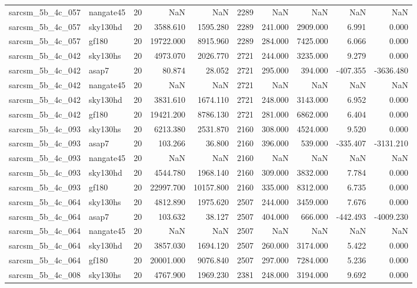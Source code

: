 \documentclass{article}
\begin{document}
\begin{longtable}{llrrrrrrrr}
sarcsm\_5b\_4c\_057 & nangate45 & 20 & NaN & NaN & 2289 & NaN & NaN & NaN & NaN \\
sarcsm\_5b\_4c\_057 & sky130hd & 20 & 3588.610 & 1595.280 & 2289 & 241.000 & 2909.000 & 6.991 & 0.000 \\
sarcsm\_5b\_4c\_057 & gf180 & 20 & 19722.000 & 8915.960 & 2289 & 284.000 & 7425.000 & 6.066 & 0.000 \\
sarcsm\_5b\_4c\_042 & sky130hs & 20 & 4973.070 & 2026.770 & 2721 & 244.000 & 3235.000 & 9.279 & 0.000 \\
sarcsm\_5b\_4c\_042 & asap7 & 20 & 80.874 & 28.052 & 2721 & 295.000 & 394.000 & -407.355 & -3636.480 \\
sarcsm\_5b\_4c\_042 & nangate45 & 20 & NaN & NaN & 2721 & NaN & NaN & NaN & NaN \\
sarcsm\_5b\_4c\_042 & sky130hd & 20 & 3831.610 & 1674.110 & 2721 & 248.000 & 3143.000 & 6.952 & 0.000 \\
sarcsm\_5b\_4c\_042 & gf180 & 20 & 19421.200 & 8786.130 & 2721 & 281.000 & 6862.000 & 6.404 & 0.000 \\
sarcsm\_5b\_4c\_093 & sky130hs & 20 & 6213.380 & 2531.870 & 2160 & 308.000 & 4524.000 & 9.520 & 0.000 \\
sarcsm\_5b\_4c\_093 & asap7 & 20 & 103.266 & 36.800 & 2160 & 396.000 & 539.000 & -335.407 & -3131.210 \\
sarcsm\_5b\_4c\_093 & nangate45 & 20 & NaN & NaN & 2160 & NaN & NaN & NaN & NaN \\
sarcsm\_5b\_4c\_093 & sky130hd & 20 & 4544.780 & 1968.140 & 2160 & 309.000 & 3832.000 & 7.784 & 0.000 \\
sarcsm\_5b\_4c\_093 & gf180 & 20 & 22997.700 & 10157.800 & 2160 & 335.000 & 8312.000 & 6.735 & 0.000 \\
sarcsm\_5b\_4c\_064 & sky130hs & 20 & 4812.890 & 1975.620 & 2507 & 244.000 & 3459.000 & 7.676 & 0.000 \\
sarcsm\_5b\_4c\_064 & asap7 & 20 & 103.632 & 38.127 & 2507 & 404.000 & 666.000 & -442.493 & -4009.230 \\
sarcsm\_5b\_4c\_064 & nangate45 & 20 & NaN & NaN & 2507 & NaN & NaN & NaN & NaN \\
sarcsm\_5b\_4c\_064 & sky130hd & 20 & 3857.030 & 1694.120 & 2507 & 260.000 & 3174.000 & 5.422 & 0.000 \\
sarcsm\_5b\_4c\_064 & gf180 & 20 & 20001.000 & 9076.840 & 2507 & 297.000 & 7284.000 & 5.236 & 0.000 \\
sarcsm\_5b\_4c\_008 & sky130hs & 20 & 4767.900 & 1969.230 & 2381 & 248.000 & 3194.000 & 9.692 & 0.000 \\

\end{longtable}
\end{document}

